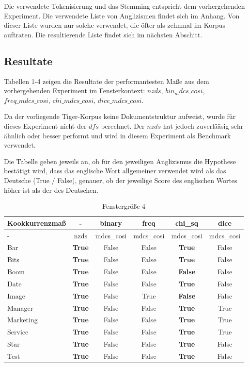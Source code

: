 \documentclass[11pt,numbers=noenddot]{scrartcl}
\begin{document}
Die verwendete Tokenisierung und das Stemming entspricht dem vorhergehenden Experiment. Die verwendete Liste von Anglizismen findet sich im Anhang. Von dieser Liste wurden nur solche verwendet, die öfter als zehnmal im Korpus auftraten. Die resultierende Liste findet sich im nächsten Abschitt.

\subsection{Resultate}

Tabellen 1-4 zeigen die Resultate der performantesten Maße aus dem vorhergehenden Experiment im Fensterkontext: $nzds$, $bin_mdcs\_cosi$, $freq\_mdcs\_cosi$, $chi\_mdcs\_cosi$, $dice\_mdcs\_cosi$.

Da der vorliegende Tiger-Korpus keine Dokumentstruktur aufweist, wurde für dieses Experiment nicht der $dfs$ berechnet. Der $nzds$ hat jedoch zuverlääsig sehr ähnlich oder besser performt und wird in diesem Experiment als Benchmark verwendet.

Die Tabelle geben jeweils an, ob für den jeweiligen Anglizismus die Hypothese bestätigt wird, dass das englische Wort allgemeiner verwendet wird als das Deutsche (True / False), genauer, ob der jeweilige Score des englischen Wortes höher ist als der des Deutschen.

\begin{table}[h]
    \begin{center}
        \begin{tabular}{ l | *{5}{c}  }
            Kookkurrenzmaß & - & binary & freq & chi\_sq & dice \\ \hline
               -      & nzds   &  mdcs\_cosi & mdcs\_cosi & mdcs\_cosi & mdcs\_cosi  \\ \hline
            Bar      &  \textbf{True}   &  False     &   False   &  \textbf{True}  & False    \\
            Bits     &  \textbf{True}   &  False     &   False   &  \textbf{True}   & False    \\
            Boom     &  \textbf{True}   &  False     &   False   &  \textbf{False}   & False    \\
            Date     &  \textbf{True}   &  False     &   False   &  \textbf{True}   & False   \\
            Image    &  \textbf{True}   &  False     &   True   &  \textbf{False}   & False   \\
            Manager  &  \textbf{True}   &  False     &   False   &  \textbf{True}   & True  \\
            Marketing&  \textbf{True}   &  False     &   False   &  \textbf{True}   & True   \\
            Service  &  \textbf{True}   &  False     &   False   &  \textbf{True}   & True   \\
            Star     &  \textbf{True}   &  False     &   False   &  \textbf{True}   & False  \\
            Test     &  \textbf{True}   &  False     &   False   &  \textbf{True} & False
        \end{tabular}
    \end{center}
    \caption{Fenstergröße 4}
\end{table}
\end{document}

